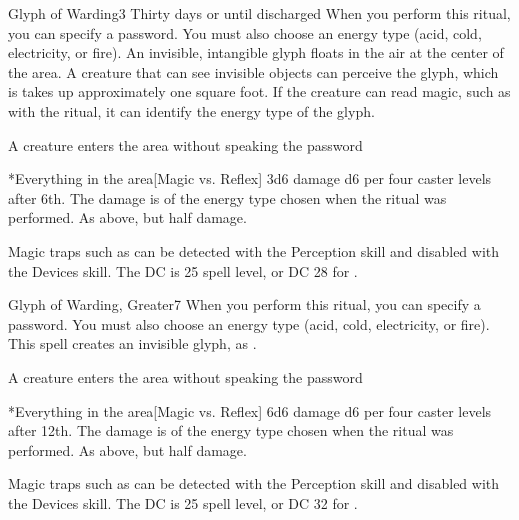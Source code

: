 \begin{spellsection}{Glyph of Warding}{3}
\spelldur Thirty days or until discharged
\spellspecial When you perform this ritual, you can specify a password. You must also choose an energy type (acid, cold, electricity, or fire).
\spellline
\spelleffect An invisible, intangible glyph floats in the air at the center of the area. A creature that can see invisible objects can perceive the glyph, which is takes up approximately one square foot. If the creature can read magic, such as with the  ritual, it can identify the energy type of the glyph.
\begin{spelltrigger}{A creature enters the area without speaking the password}
    \begin{spelltargets}*{Everything in the area}[Magic vs. Reflex]
        \spellsuccess 3d6 damage \add d6 per four caster levels after 6th. The damage is of the energy type chosen when the ritual was performed.
        \spellfailure As above, but half damage.
    \end{spelltargets}
\end{spelltrigger}
\spellnotes Magic traps such as  can be detected with the Perception skill and disabled with the Devices skill. The DC is 25 \add spell level, or DC 28 for .
\end{spellsection}

\begin{spellsection}{Glyph of Warding, Greater}{7}
\spellspecial When you perform this ritual, you can specify a password. You must also choose an energy type (acid, cold, electricity, or fire).
\spellline
\spelleffect This spell creates an invisible glyph, as .
\begin{spelltrigger}{A creature enters the area without speaking the password}
    \begin{spelltargets}*{Everything in the area}[Magic vs. Reflex]
        \spellsuccess 6d6 damage \add d6 per four caster levels after 12th. The damage is of the energy type chosen when the ritual was performed.
        \spellfailure As above, but half damage.
    \end{spelltargets}
\end{spelltrigger}
\spellnotes Magic traps such as  can be detected with the Perception skill and disabled with the Devices skill. The DC is 25 \add spell level, or DC 32 for .
\end{spellsection}

